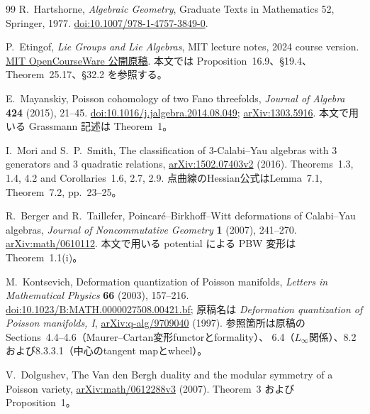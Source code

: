 \begin{thebibliography}{99}
R.~Hartshorne,
\emph{Algebraic Geometry}, Graduate Texts in Mathematics 52,
Springer, 1977.
\href{https://doi.org/10.1007/978-1-4757-3849-0}{doi:10.1007/978-1-4757-3849-0}.

P.~Etingof,
\emph{Lie Groups and Lie Algebras}, MIT lecture notes, 2024 course version.
\href{https://live.ocw.mit.edu/courses/18-755-lie-groups-and-lie-algebras-ii-spring-2024/mit18_755_s24_lec_full.pdf}{MIT OpenCourseWare 公開原稿}.
本文では Proposition~16.9、\S19.4、Theorem~25.17、\S32.2 を参照する。

E.~Mayanskiy,
Poisson cohomology of two Fano threefolds,
\emph{Journal of Algebra} \textbf{424} (2015), 21--45.
\href{https://doi.org/10.1016/j.jalgebra.2014.08.049}{doi:10.1016/j.jalgebra.2014.08.049};
\href{https://arxiv.org/abs/1303.5916}{arXiv:1303.5916}.
本文で用いる Grassmann 記述は Theorem~1。

I.~Mori and S.~P.~Smith,
The classification of 3-Calabi--Yau algebras with 3 generators and 3 quadratic relations,
\href{https://arxiv.org/abs/1502.07403v2}{arXiv:1502.07403v2} (2016).
Theorems~1.3, 1.4, 4.2 and Corollaries~1.6, 2.7, 2.9.
点曲線のHessian公式はLemma~7.1, Theorem~7.2, pp.~23--25。

R.~Berger and R.~Taillefer,
Poincar\'e--Birkhoff--Witt deformations of Calabi--Yau algebras,
\emph{Journal of Noncommutative Geometry} \textbf{1} (2007), 241--270.
\href{https://arxiv.org/abs/math/0610112}{arXiv:math/0610112}.
本文で用いる potential による PBW 変形は Theorem~1.1(i)。

M.~Kontsevich,
Deformation quantization of Poisson manifolds,
\emph{Letters in Mathematical Physics} \textbf{66} (2003), 157--216.
\href{https://doi.org/10.1023/B:MATH.0000027508.00421.bf}{doi:10.1023/B:MATH.0000027508.00421.bf};
原稿名は \emph{Deformation quantization of Poisson manifolds, I},
\href{https://arxiv.org/abs/q-alg/9709040}{arXiv:q-alg/9709040} (1997).
参照箇所は原稿のSections~4.4--4.6（Maurer--Cartan変形functorとformality）、
6.4（$L_\infty$関係）、8.2および8.3.3.1（中心のtangent mapとwheel）。

V.~Dolgushev,
The Van den Bergh duality and the modular symmetry of a Poisson variety,
\href{https://arxiv.org/abs/math/0612288v3}{arXiv:math/0612288v3} (2007).
Theorem~3 および Proposition~1。


\end{thebibliography}
